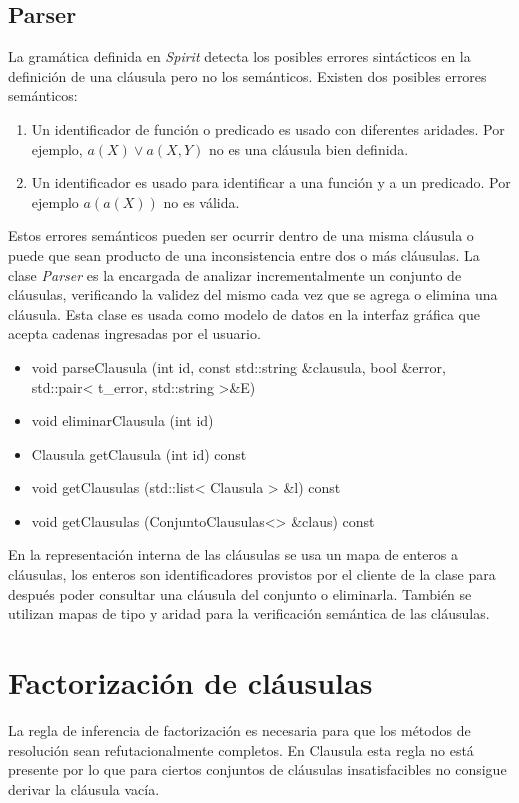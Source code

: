 \documentclass[a4paper,12pt]{article}
\begin{document}
\subsection{Parser}
La gramática definida en \emph{Spirit} detecta los posibles errores sintácticos en la definición
de una cláusula pero no los semánticos. Existen dos posibles errores semánticos:
\begin{enumerate}
\item Un identificador de función o predicado es usado con diferentes aridades. Por ejemplo, $a(X) \lor a(X,Y)$ no
es una cláusula bien definida.
\item Un identificador es usado para identificar a una función y a un predicado. Por ejemplo $a(a(X))$ no es válida.
\end{enumerate}
Estos errores semánticos pueden ser ocurrir dentro de una misma cláusula o puede que sean producto de una
inconsistencia entre dos o más cláusulas. La clase \emph{Parser} es la encargada de analizar incrementalmente
un conjunto de cláusulas, verificando la validez del mismo cada vez que se agrega o elimina una cláusula.
Esta clase es usada como modelo de datos en la interfaz gráfica que acepta cadenas ingresadas por el usuario.
\begin{itemize}
\renewcommand{\labelitemi}{$\bullet$}
\item void parseClausula (int id, const std::string \&clausula, bool \&error, std::pair< t\_error, std::string >\&E)
\item void eliminarClausula (int id)
\item Clausula getClausula (int id) const
\item void getClausulas (std::list< Clausula > \&l) const
\item void getClausulas (ConjuntoClausulas<> \&claus) const
\end{itemize}
En la representación interna de las cláusulas se usa un mapa de enteros a cláusulas, los enteros
son identificadores provistos por el cliente de la clase para después poder consultar una cláusula
del conjunto o eliminarla. También se utilizan mapas de tipo y aridad para la verificación semántica
de las cláusulas.
\section{Factorización de cláusulas}
La regla de inferencia de factorización\cite{PracticalLogic} es necesaria para que los métodos de
resolución sean refutacionalmente completos. En Clausula esta regla no está presente por lo que
para ciertos conjuntos de cláusulas insatisfacibles no consigue derivar la cláusula vacía.
\end{document}
